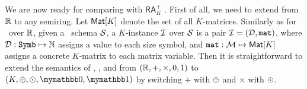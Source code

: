 We are now ready for comparing \langsum with $\mathsf{RA}_{K}^+$ . First of all, we need to extend \langsum from $\mathbb{R}$ to any semiring. Let $\textsf{Mat}[K]$ denote the set of all $K$-matrices. 
Similarly as for \lang\ over $\mathbb{R}$, given a \lang\ schema $\mathcal{S}$, a $K$-instance $\mathcal{I}$ over $\mathcal{S}$ is a pair $\mathcal{I} = (\mathcal{D},\texttt{mat})$, where $\mathcal{D} : \texttt{Symb} \mapsto \mathbb{N}$ assigns a value to each size symbol, and $\texttt{mat} : \mathcal{M} \mapsto \textsf{Mat}[K]$ assigns a concrete $K$-matrix to each matrix variable. Then it is straightforward to extend the semantics of \lang, \langfor, and \langsum from $(\mathbb{R}, +, \times, 0, 1)$ to $(K, \ksum, \kprod, \kzero, \kone)$ by switching $+$ with $\oplus$ and $\times$ with $\odot$. 

